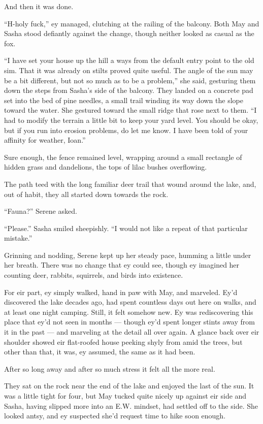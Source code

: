 And then it was done.

``H-holy fuck,'' ey managed, clutching at the railing of the balcony. Both May and Sasha stood defiantly against the change, though neither looked as casual as the fox.

``I have set your house up the hill a ways from the default entry point to the old sim. That it was already on stilts proved quite useful. The angle of the sun may be a bit different, but not so much as to be a problem,'' she said, gesturing them down the steps from Sasha's side of the balcony. They landed on a concrete pad set into the bed of pine needles, a small trail winding its way down the slope toward the water. She gestured toward the small ridge that rose next to them. ``I had to modify the terrain a little bit to keep your yard level. You should be okay, but if you run into erosion problems, do let me know. I have been told of your affinity for weather, Ioan.''

Sure enough, the fence remained level, wrapping around a small rectangle of hidden grass and dandelions, the tops of lilac bushes overflowing.

The path teed with the long familiar deer trail that wound around the lake, and, out of habit, they all started down towards the rock.

``Fauna?'' Serene asked.

``Please.'' Sasha smiled sheepishly. ``I would not like a repeat of that particular mistake.''

Grinning and nodding, Serene kept up her steady pace, humming a little under her breath. There was no change that ey could see, though ey imagined her counting deer, rabbits, squirrels, and birds into existence.

For eir part, ey simply walked, hand in paw with May, and marveled. Ey'd discovered the lake decades ago, had spent countless days out here on walks, and at least one night camping. Still, it felt somehow new. Ey was rediscovering this place that ey'd not seen in months — though ey'd spent longer stints away from it in the past — and marveling at the detail all over again. A glance back over eir shoulder showed eir flat-roofed house peeking shyly from amid the trees, but other than that, it was, ey assumed, the same as it had been.

After so long away and after so much stress it felt all the more real.

They sat on the rock near the end of the lake and enjoyed the last of the sun. It was a little tight for four, but May tucked quite nicely up against eir side and Sasha, having slipped more into an E.W. mindset, had settled off to the side. She looked antsy, and ey suspected she'd request time to hike soon enough.

